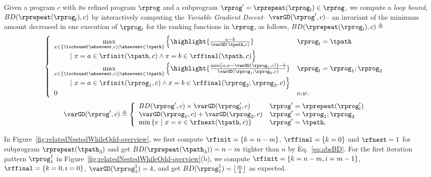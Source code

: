 \begin{defn}
\label{def:loopbound}
Given a program $c$ with its refined program $\rprog$ and a subprogram $\rprog' = \rprepeat(\rprog_l) \in \rprog$, we compute a \emph{loop bound}, $BD(\rprepeat(\rprog_l), c)$ by interactively computing
the \emph{Variable Gradient Decent}-- 
 $\varGD(\rprog', c)$-- an invariant of the minimum amount decreased in one execution of $\rprog_l$ for the ranking functions in $\rprog$, as follows, $ BD(\rprepeat(\rprog_l), c) \triangleq$
{\small
 \[
 \left\{ 
 \begin{array}{ll}
 \max\limits_{x \in \left\{ \locbound(\absevent, c) | \absevent \in \tpath \right\}} 
 \Big\{ \highlight{\frac{a - b}{\varGD(\tpath, c)}} & \rprog_l = \tpath
 \\ \qquad 
 ~\vert~
 x = a \in \rfinit(\tpath, c)
 \land x = b \in \rffinal(\tpath, c)
 \Big\} 
 \\
 \max\limits_{x \in \left\{ \locbound(\absevent, c) | \absevent \in \tpath \right\}} 
 \Big\{ \highlight{\frac{\min\{ a, a - \varGD(\rprog_1, c) \} - b}{\varGD(\rprog_1;\rprog_2, c)}} 
 & \rprog_l = \rprog_1;\rprog_2
 \\ \qquad 
 ~\vert~
 x = a \in \rfinit(\rprog_1, c)
 \land x = b \in \rffinal(\rprog_2;\rprog_2, c)
 \Big\} \\
 0 & o.w.
 \end{array} 
 \right.
\]
\[
 \varGD(\rprog', c) \triangleq
 \left\{
 \begin{array}{ll}
 BD(\rprog', c) \times {\varGD(\rprog_l', c)} & \rprog' = \rprepeat(\rprog_l') \\
 \varGD(\rprog_1, c) + \varGD(\rprog_2, c) & \rprog' = \rprog_1;\rprog_2 \\
 \min\left\{v ~|~ x = v \in \rfnext(\tpath, c) \right\} & \rprog' = \tpath, 
 \end{array}
 \right.
 \]
}
\end{defn}
In Figure~\ref{fig:relatedNestedWhileOdd-overview}, we first compute $\rfinit = \{k = n - m\}$, $\rffinal = \{k = 0\}$ and $\rfnext = 1$ for subprogram $\rprepeat(\tpath_3)$ and get $BD(\rprepeat(\tpath_3)) = n - m$ tighter than $n$ by Eq.~\ref{eq:absBD}.
For the first iteration pattern $\rprog_1^1$ in Figure~\ref{fig:relatedNestedWhileOdd-overview}(b), we compute 
$\rfinit = \{k = n - m, i = m - 1\}$, $\rffinal = \{k = 0, i = 0\}$, $\varGD(\rprog_1^1) = 4$, and get $BD(\rprog_1^1) = \lfloor \frac{m}{4} \rfloor $ as expected.

